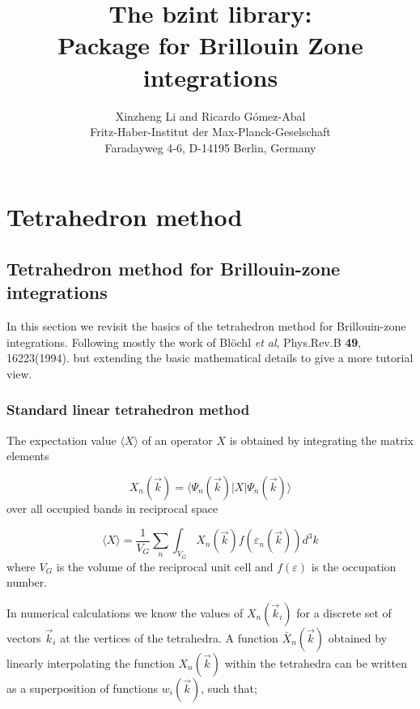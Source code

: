 \documentclass[10pt]{article}
\begin{document}
\title{The bzint library:\\ Package for Brillouin Zone integrations }

\author{Xinzheng Li and Ricardo G\'omez-Abal \\Fritz-Haber-Institut der Max-Planck-Geselschaft \\ Faradayweg 4-6, D-14195 Berlin, Germany}

\maketitle

\tableofcontents
\newpage
\section{Tetrahedron method}

\subsection{Tetrahedron method for Brillouin-zone integrations}

In this section we revisit the basics of the tetrahedron method for Brillouin-zone integrations.
Following mostly the work of Bl{\"o}chl \textit{et al}, Phys.Rev.B \textbf{49}, 16223(1994). but extending the basic mathematical
details to give a more tutorial view.

\subsubsection{Standard linear tetrahedron method}

The expectation value $\langle X \rangle$ of an operator $X$ is obtained by integrating the matrix
elements

\begin{equation}\label{Xn}
X_n(\vec{k})=\langle \Psi_n(\vec{k})|X|\Psi_n(\vec{k})\rangle
\end{equation}
over all occupied bands in reciprocal space

\begin{equation}\label{X}
\langle X \rangle=\frac{1}{V_G}\sum\limits_n{\int_{V_G}{X_n(\vec{k})f(\varepsilon_n(\vec{k}))d^3k}}
\end{equation}
where $V_G$ is the volume of the reciprocal unit cell and $f(\varepsilon)$ is the occupation number.

In numerical calculations we know the values of $X_n(\vec{k}_i)$ for a discrete set of vectors
$\vec{k}_i$ at the vertices of the tetrahedra. A function $\bar{X}_n(\vec{k})$ obtained by linearly
interpolating the function $X_n(\vec{k})$ within the tetrahedra can be written as a superposition of
functions $w_i(\vec{k})$, such that;
\end{document}
